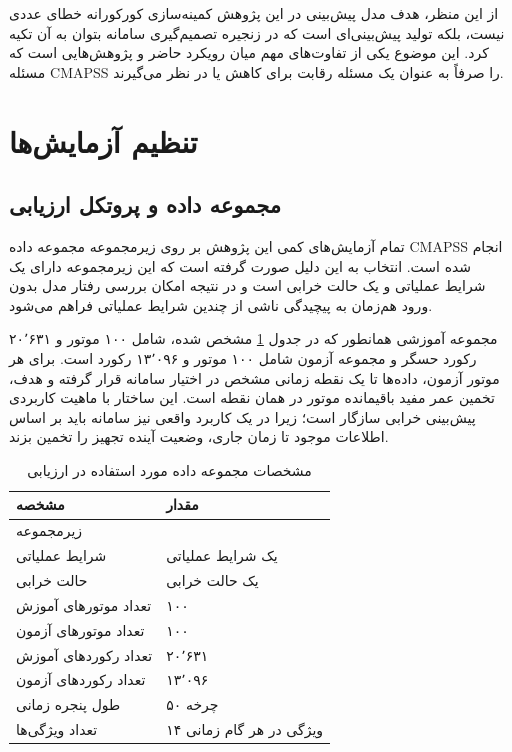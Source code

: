 \documentclass[a4paper,fleqn]{report}
\begin{document}
از این منظر، هدف مدل پیش‌بینی در این پژوهش کمینه‌سازی کورکورانه خطای عددی نیست، بلکه تولید پیش‌بینی‌ای است که در زنجیره تصمیم‌گیری سامانه بتوان به آن تکیه کرد. این موضوع یکی از تفاوت‌های مهم میان رویکرد حاضر و پژوهش‌هایی است که مسئله CMAPSS را صرفاً به عنوان یک مسئله رقابت برای کاهش  یا  در نظر می‌گیرند.

\section{تنظیم آزمایش‌ها}
\label{sec:experiment-setup}

\subsection{مجموعه داده و پروتکل ارزیابی}

تمام آزمایش‌های کمی این پژوهش بر روی زیرمجموعه  مجموعه داده \gls{CMAPSS} انجام شده است. انتخاب  به این دلیل صورت گرفته است که این زیرمجموعه دارای یک شرایط عملیاتی و یک حالت خرابی است و در نتیجه امکان بررسی رفتار مدل بدون ورود هم‌زمان به پیچیدگی ناشی از چندین شرایط عملیاتی فراهم می‌شود.

مجموعه آموزشی همانطور که در جدول 
\ref{tab:eval-data}
مشخص شده،
شامل ۱۰۰ موتور و ۲۰٬۶۳۱ رکورد حسگر و مجموعه آزمون شامل ۱۰۰ موتور و ۱۳٬۰۹۶ رکورد است. برای هر موتور آزمون، داده‌ها تا یک نقطه زمانی مشخص در اختیار سامانه قرار گرفته و هدف، تخمین عمر مفید باقیمانده موتور در همان نقطه است. این ساختار با ماهیت کاربردی پیش‌بینی خرابی سازگار است؛ زیرا در یک کاربرد واقعی نیز سامانه باید بر اساس اطلاعات موجود تا زمان جاری، وضعیت آینده تجهیز را تخمین بزند.

\begin{table}[ht]
	\centering
	\caption{مشخصات مجموعه داده مورد استفاده در ارزیابی}
	\label{tab:eval-data}
	\begin{tabular}{p{5cm}p{6cm}}
		\toprule
		\textbf{مشخصه} & \textbf{مقدار} \\
		\midrule
		زیرمجموعه & \lr{FD001} \\
		شرایط عملیاتی & یک شرایط عملیاتی \\
		حالت خرابی & یک حالت خرابی \\
		تعداد موتورهای آموزش & ۱۰۰ \\
		تعداد موتورهای آزمون & ۱۰۰ \\
		تعداد رکوردهای آموزش & ۲۰٬۶۳۱ \\
		تعداد رکوردهای آزمون & ۱۳٬۰۹۶ \\
		طول پنجره زمانی & ۵۰ چرخه \\
		تعداد ویژگی‌ها & ۱۴ ویژگی در هر گام زمانی \\
		\bottomrule
	\end{tabular}
\end{table}
\end{document}
